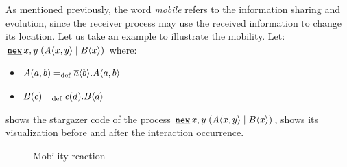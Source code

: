 As mentioned previously, the word \textit{mobile} refers to the information sharing and evolution, since the receiver process may use the received information to change its location. Let us take an example to illustrate the mobility. Let: $\procres{x,y}{(\procpar{\proccall{A}{x,y}}{\proccall{B}{x}})}$ where:
\begin{itemize}
\item $A(a,b)=_{\mathrm{def}}{}\overline{a}\langle{b}\rangle.A\langle a,b\rangle$
\item $B(c)=_{\mathrm{def}}{}c({d}).B\langle d\rangle$
\end{itemize}


 shows the stargazer code of the process $\procres{x,y}{(\procpar{\proccall{A}{x,y}}{\proccall{B}{x}})}$,   shows its visualization before and after the interaction occurrence.

\raggedbottom

\begin{figure}[H]%
\centering
{}%
\hfill
{}%
\caption{Mobility reaction}
\label{pi_mobility_stargazer_react}%
\end{figure}


